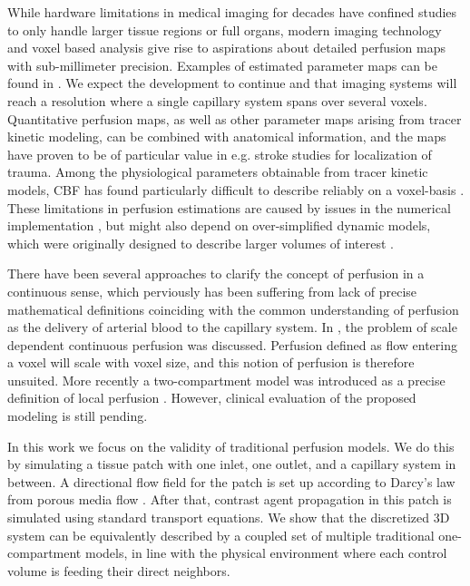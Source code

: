 \documentclass[journal,twocolumn]{IEEEtran}
\begin{document}
	While hardware limitations in medical imaging for decades have confined studies to only handle larger tissue regions or full organs, modern imaging technology and voxel based analysis give rise to aspirations about detailed perfusion maps with sub-millimeter precision. Examples of estimated parameter maps can be found in \cite{Feng2013,Chen2011}. We expect the development to continue and that imaging systems will reach a resolution where a single capillary system spans over several voxels.
	Quantitative perfusion maps, as well as other parameter maps arising from tracer kinetic modeling, can be combined with anatomical information, and the maps have proven to be of particular value in e.g. stroke studies for localization of trauma. 
	Among the physiological parameters obtainable from tracer kinetic models, CBF has found particularly difficult to describe reliably on a voxel-basis \cite{kudo10}.
	These limitations in perfusion estimations are caused by issues in the numerical implementation \cite{kudo10}, but might also depend on over-simplified dynamic models, which were originally designed to describe larger volumes of interest \cite{zierler00}.	
	
	There have been several approaches to clarify the concept of perfusion in a continuous sense, which perviously has been suffering from lack of precise mathematical definitions coinciding with the common understanding of perfusion as the delivery of arterial blood to the capillary system.
	In \cite{Henkelman1990}, the problem of scale dependent continuous perfusion was discussed. Perfusion defined as flow entering a voxel will scale with voxel size, 
	and this notion of perfusion is therefore unsuited.	
	More recently a two-compartment model was introduced as a precise definition of local perfusion \cite{sourbron14}.	
	However, clinical evaluation of the proposed modeling is still pending.
	
	In this work we focus on the validity of traditional perfusion models.
	We do this by simulating a tissue patch with one inlet, one outlet, and a capillary system in between.
	A directional flow field for the patch is set up according to Darcy's law from porous media flow \cite{Darcy56}.
	After that, contrast agent propagation in this patch is simulated using standard transport equations.
	We show that the discretized 3D system can be equivalently described by a coupled set of multiple traditional one-compartment models, in line with the physical environment where each control volume is feeding their direct neighbors.
	
\end{document}
